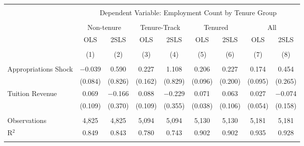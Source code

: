 
\begin{tabular}{@{\extracolsep{5pt}}lcccccccc} 
\\[-1.8ex]\hline 
\hline \\[-1.8ex] 
 & \multicolumn{8}{c}{Dependent Variable: Employment Count by Tenure Group} \\ 
\cline{2-9} 
\\[-1.8ex] & \multicolumn{2}{c}{Non-tenure} & \multicolumn{2}{c}{Tenure-Track} & \multicolumn{2}{c}{Tenured} & \multicolumn{2}{c}{All} \\ 
 & OLS & 2SLS & OLS & 2SLS & OLS & 2SLS & OLS & 2SLS \\ 
\\[-1.8ex] & (1) & (2) & (3) & (4) & (5) & (6) & (7) & (8)\\ 
\hline \\[-1.8ex] 
 Appropriations Shock & $-$0.039 & 0.590 & 0.227 & 1.108 & 0.206 & 0.227 & 0.174 & 0.454 \\ 
  & (0.084) & (0.826) & (0.162) & (0.829) & (0.096) & (0.200) & (0.095) & (0.265) \\ 
  Tuition Revenue & 0.069 & $-$0.166 & 0.088 & $-$0.229 & 0.071 & 0.063 & 0.027 & $-$0.074 \\ 
  & (0.109) & (0.370) & (0.109) & (0.355) & (0.038) & (0.106) & (0.054) & (0.158) \\ 
 \hline \\[-1.8ex] 
Observations & 4,825 & 4,825 & 5,094 & 5,094 & 5,130 & 5,130 & 5,181 & 5,181 \\ 
R$^{2}$ & 0.849 & 0.843 & 0.780 & 0.743 & 0.902 & 0.902 & 0.935 & 0.928 \\ 
\hline 
\hline \\[-1.8ex] 
\end{tabular} 
